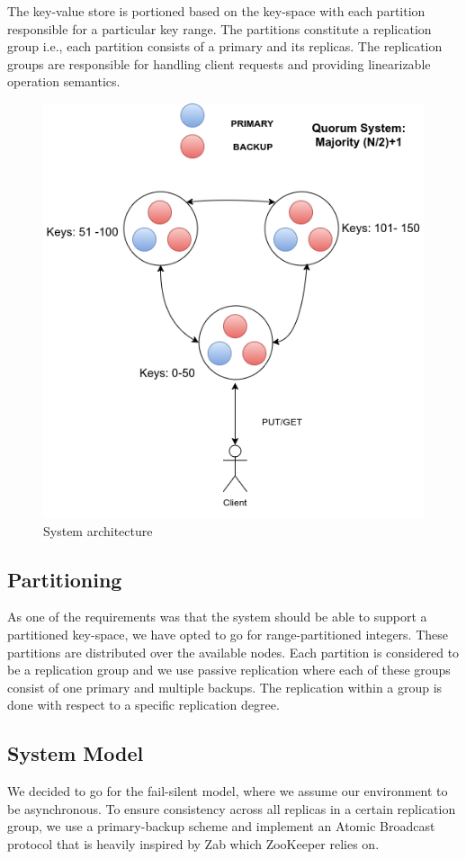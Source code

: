 \documentclass[12pt]{article}
\begin{document}
The key-value store is portioned based on the key-space with each partition responsible for a particular key range. The partitions constitute a replication group i.e., each partition consists of a primary and its replicas. The replication groups are responsible for handling client requests and providing linearizable operation semantics.
\begin{figure}[H]
  \centering
  \includegraphics[scale=0.6,clip]{img/architecture}
  \caption[Caption for LOF]{System architecture}  
  \label{fig:picture}
\end{figure} 

\subsection{Partitioning}
As one of the requirements was that the system should be able to support a partitioned key-space, we have opted to go for range-partitioned integers. These partitions are distributed over the available nodes. Each partition is considered to be a replication group and we use passive replication where each of these groups consist of one primary and multiple backups. The replication within a group is done with respect to a specific replication degree.

\subsection{System Model}
We decided to go for the fail-silent model, where we assume our environment to be asynchronous. To ensure consistency across all replicas in a certain replication group, we use a primary-backup scheme and implement an Atomic Broadcast protocol that is heavily inspired by Zab \cite{Junqueira:2011:ZHB:2056308.2056409} which ZooKeeper \cite{Hunt:2010:ZWC:1855840.1855851} relies on.
\end{document}
